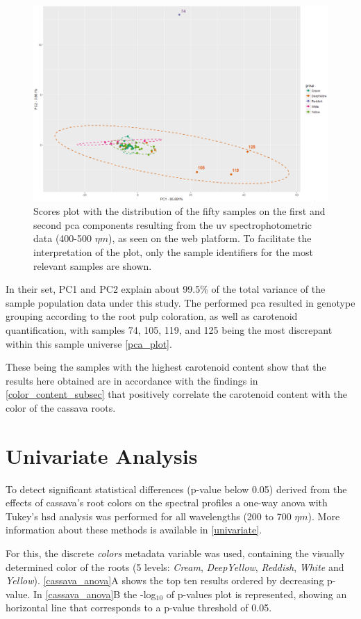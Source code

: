 \begin{figure}[h]
	\centering
	\includegraphics[width=0.7\linewidth]{Imagens/Case_study/pca_plot_3}
	\caption{Scores plot with the distribution of the fifty samples on the first and second \gls{pca} components resulting from the \gls{uv} spectrophotometric data (400-500 $\eta m$), as seen on the web platform. To facilitate the interpretation of the plot, only the sample identifiers for the most relevant samples are shown.}
	\label{pca_plot}
\end{figure}


In their set, PC1 and PC2 explain about 99.5\% of the total variance of the sample population data under this study. The performed \gls{pca} resulted in genotype grouping according to the root pulp coloration, as well as carotenoid quantification, with samples 74, 105, 119, and 125 being the most discrepant within this sample universe \autoref{pca_plot}. 

These being the samples with the highest carotenoid content show that the results here obtained are in accordance with the findings in \autoref{color_content_subsec} that positively correlate the carotenoid content with the color of the cassava roots.


\section{Univariate Analysis} \label{univ_analysis}

To detect significant statistical differences (p-value below 0.05) derived from the effects of cassava's root colors on the spectral profiles a one-way \gls{anova} with Tukey's \gls{hsd} analysis was performed for all wavelengths (200 to 700 $\eta m$). More information about these methods is available in \autoref{univariate}.

For this, the discrete \textit{colors} metadata variable was used, containing the visually determined color of the roots (5 levels:  \textit{Cream}, \textit{DeepYellow}, \textit{Reddish}, \textit{White} and \textit{Yellow}). \autoref{cassava_anova}A shows the top ten results ordered by decreasing p-value. In \autoref{cassava_anova}B the -log$_{10}$ of p-values plot is represented, showing an horizontal line that corresponds to a p-value threshold of 0.05. 


